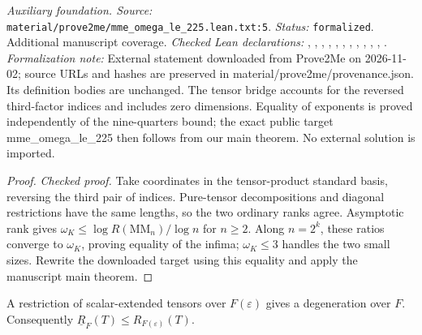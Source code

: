 \noindent\textit{Auxiliary foundation. Source:} \texttt{material/prove2me/mme\_omega\_le\_225.lean.txt:5}.
\textit{Status:} \texttt{formalized}. Additional manuscript coverage.
\textit{Checked Lean declarations:} , , , , , , , , , , , .
\textit{Formalization note:} External statement downloaded from Prove2Me on 2026-11-02; source URLs and hashes are preserved in material/prove2me/provenance.json. Its definition bodies are unchanged. The tensor bridge accounts for the reversed third-factor indices and includes zero dimensions. Equality of exponents is proved independently of the nine-quarters bound; the exact public target mme\_omega\_le\_225 then follows from our main theorem. No external solution is imported.

\begin{proof}
\leanok
{}
\textit{Checked proof.} Take coordinates in the tensor-product standard basis, reversing the third pair of indices. Pure-tensor decompositions and diagonal restrictions have the same lengths, so the two ordinary ranks agree. Asymptotic rank gives $\omega_K\le\log R(\mathrm{MM}_n)/\log n$ for $n\ge2$. Along $n=2^k$, these ratios converge to $\omega_K$, proving equality of the infima; $\omega_K\le3$ handles the two small sizes. Rewrite the downloaded target using this equality and apply the manuscript main theorem.
\end{proof}

\renewcommand{\thetheorem}{A81}
\begin{lemma}
\label{aux:rational-specialization-rank}
\manuscriptproof
{}
\leanok
A restriction of scalar-extended tensors over $F(\varepsilon)$ gives a degeneration over $F$. Consequently $\underline R_F(T)\le R_{F(\varepsilon)}(T)$.
\end{lemma}

